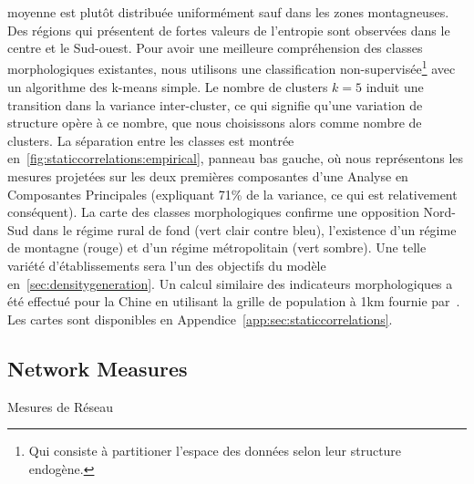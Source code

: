 {moyenne est plutôt distribuée uniformément sauf dans les zones montagneuses. Des régions qui présentent de fortes valeurs de l'entropie sont observées dans le centre et le Sud-ouest. Pour avoir une meilleure compréhension des classes morphologiques existantes, nous utilisons une classification non-supervisée\footnote{Qui consiste à partitioner l'espace des données selon leur structure endogène.} avec un algorithme des k-means simple. Le nombre de clusters $k=5$ induit une transition dans la variance inter-cluster, ce qui signifie qu'une variation de structure opère à ce nombre, que nous choisissons alors comme nombre de clusters. La séparation entre les classes est montrée en~\ref{fig:staticcorrelations:empirical}, panneau bas gauche, où nous représentons les mesures projetées sur les deux premières composantes d'une Analyse en Composantes Principales (expliquant 71\% de la variance, ce qui est relativement conséquent). La carte des classes morphologiques confirme une opposition Nord-Sud dans le régime rural de fond (vert clair contre bleu), l'existence d'un régime de montagne (rouge) et d'un régime métropolitain (vert sombre). Une telle variété d'établissements sera l'un des objectifs du modèle en~\ref{sec:densitygeneration}. Un calcul similaire des indicateurs morphologiques a été effectué pour la Chine en utilisant la grille de population à 1km fournie par~\cite{fu1km}. Les cartes sont disponibles en Appendice~\ref{app:sec:staticcorrelations}.
}







\subsection{Network Measures}{Mesures de Réseau}


